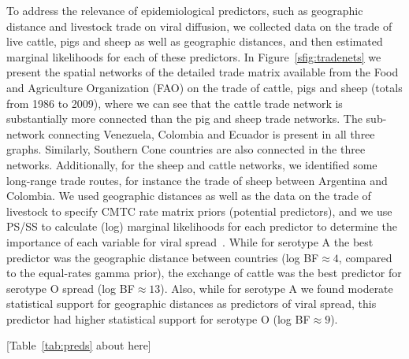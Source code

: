 \documentclass[10pt]{article}
\begin{document}
To address the relevance of epidemiological predictors, such as geographic distance and livestock trade on viral diffusion, we collected data on the trade of live cattle, pigs and sheep  as well as geographic distances, and then estimated marginal likelihoods for each of these predictors.
In Figure~\ref{sfig:tradenets} we present the spatial networks of the detailed trade matrix available from the Food and Agriculture Organization (FAO) on the trade of cattle, pigs and sheep (totals from 1986 to 2009), where we can see that the cattle trade network is substantially more connected than the pig and sheep trade networks.
The sub-network connecting Venezuela, Colombia and Ecuador is present in all three graphs.
Similarly, Southern Cone countries are also connected in the three networks.
Additionally, for the sheep and cattle networks, we identified some long-range trade routes, for instance the trade of sheep between Argentina and Colombia.
We used geographic distances as well as the data on the trade of livestock to specify CMTC rate matrix priors (potential predictors), and we use PS/SS to calculate (log) marginal likelihoods for each predictor to determine the importance of each variable for viral spread~\cite{Carvalho2013, Nelson2011}.
While for serotype A the best predictor was the geographic distance between countries (log BF$\approx 4$, compared to the equal-rates gamma prior), the exchange of cattle was the best predictor for serotype O spread (log BF$\approx 13$). 
Also, while for serotype A we found moderate statistical support for geographic distances as predictors of viral spread, this predictor had higher statistical support for serotype O (log BF$\approx 9$).

\begin{center}
 [Table~\ref{tab:preds} about here]
\end{center}
\end{document}
